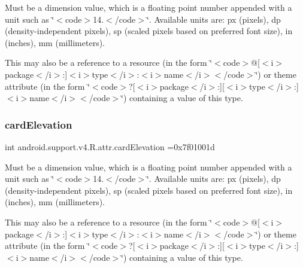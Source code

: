 Must be a dimension value, which is a floating point number appended with a unit such as \char`\"{}$<$code$>$14.\+5sp$<$/code$>$\char`\"{}. Available units are\+: px (pixels), dp (density-\/independent pixels), sp (scaled pixels based on preferred font size), in (inches), mm (millimeters). 

This may also be a reference to a resource (in the form \char`\"{}$<$code$>$@\mbox{[}$<$i$>$package$<$/i$>$\+:\mbox{]}$<$i$>$type$<$/i$>$\+:$<$i$>$name$<$/i$>$$<$/code$>$\char`\"{}) or theme attribute (in the form \char`\"{}$<$code$>$?\mbox{[}$<$i$>$package$<$/i$>$\+:\mbox{]}\mbox{[}$<$i$>$type$<$/i$>$\+:\mbox{]}$<$i$>$name$<$/i$>$$<$/code$>$\char`\"{}) containing a value of this type. \mbox{\label{classandroid_1_1support_1_1v4_1_1R_1_1attr_ae0e8dfe0af81d234bebc4a066c5b5c2f}} 
\subsubsection{\texorpdfstring{card\+Elevation}{cardElevation}}
{\footnotesize\ttfamily int android.\+support.\+v4.\+R.\+attr.\+card\+Elevation =0x7f01001d\hspace{0.3cm}{\ttfamily [static]}}

Must be a dimension value, which is a floating point number appended with a unit such as \char`\"{}$<$code$>$14.\+5sp$<$/code$>$\char`\"{}. Available units are\+: px (pixels), dp (density-\/independent pixels), sp (scaled pixels based on preferred font size), in (inches), mm (millimeters). 

This may also be a reference to a resource (in the form \char`\"{}$<$code$>$@\mbox{[}$<$i$>$package$<$/i$>$\+:\mbox{]}$<$i$>$type$<$/i$>$\+:$<$i$>$name$<$/i$>$$<$/code$>$\char`\"{}) or theme attribute (in the form \char`\"{}$<$code$>$?\mbox{[}$<$i$>$package$<$/i$>$\+:\mbox{]}\mbox{[}$<$i$>$type$<$/i$>$\+:\mbox{]}$<$i$>$name$<$/i$>$$<$/code$>$\char`\"{}) containing a value of this type. \mbox{\label{classandroid_1_1support_1_1v4_1_1R_1_1attr_ad18cbbc644b56d8fbbc0f10f5ddba48a}} 
